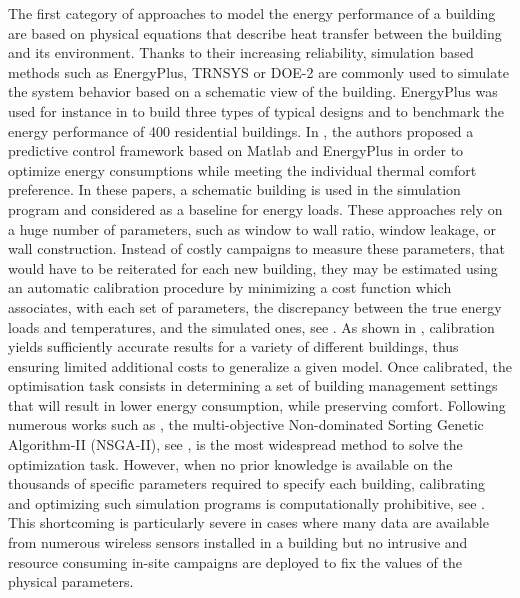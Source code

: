 \documentclass[12pt]{article}
\begin{document}
The first category of approaches to model the energy performance of a building are based on physical equations that describe heat transfer between the building and its environment. Thanks to their increasing reliability, simulation based methods such as EnergyPlus, TRNSYS or DOE-2  are commonly used to simulate the system behavior based on a schematic view of the building. EnergyPlus was used for instance in \cite{shabunko2018energyplus} to build three types of typical designs and to benchmark the energy performance of 400 residential buildings. In \cite{zhao2016occupant}, the authors proposed a predictive control framework based on Matlab and EnergyPlus in order to optimize energy consumptions while meeting the individual thermal comfort preference. In these papers, a schematic building is used in the simulation program and considered as a baseline for energy loads. %
These approaches rely on a huge number of parameters, such as window to wall ratio, window leakage, or wall construction. Instead of costly campaigns to measure these parameters, that would have to be reiterated for each new building, they may be estimated using an automatic calibration procedure by minimizing a cost function which associates, with each set of parameters, the discrepancy between the true energy loads and temperatures, and the simulated ones, see \cite{Coakley2014ARO, Corff2018OPTIMIZINGTC}. As shown in \cite{Nagpal2019AMF}, calibration yields sufficiently accurate results for a variety of different buildings, thus ensuring limited additional costs to generalize a given model. Once calibrated, the optimisation task consists in determining a set of building management settings that will result in lower energy consumption, while preserving comfort. Following numerous works such as \cite{Bre2020AnEM}, the multi-objective Non-dominated Sorting Genetic Algorithm-II (NSGA-II), see \cite{Deb2000AFE}, is the most widespread method to solve the optimization task.  However, when no prior knowledge is available on the thousands of specific parameters required to specify each building, calibrating and optimizing such simulation programs is computationally prohibitive, see \cite{Westermann2019SurrogateMF}. This shortcoming is particularly severe in cases where many data are available from numerous wireless sensors installed in a building but no intrusive and resource consuming in-site campaigns are deployed to fix the values of the physical parameters.
\end{document}
